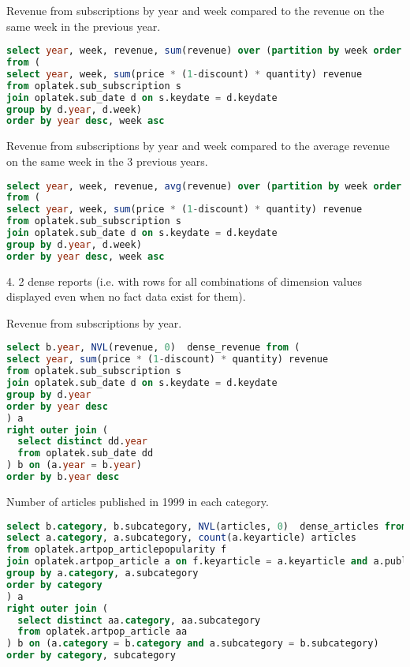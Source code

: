 Revenue from subscriptions by year and week compared to the revenue on the same week in the previous year.
\begin{lstlisting}[language=sql] 
select year, week, revenue, sum(revenue) over (partition by week order by year RANGE BETWEEN 1 PRECEDING AND 1 PRECEDING) revenue_last_year_this_week        
from (
select year, week, sum(price * (1-discount) * quantity) revenue 
from oplatek.sub_subscription s 
join oplatek.sub_date d on s.keydate = d.keydate 
group by d.year, d.week)
order by year desc, week asc
\end{lstlisting}

Revenue from subscriptions by year and week compared to the average revenue on the same week in the 3 previous years.
\begin{lstlisting}[language=sql] 
select year, week, revenue, avg(revenue) over (partition by week order by year RANGE BETWEEN 3 PRECEDING AND 1 PRECEDING) avg_revenue_prev_3_years        
from (
select year, week, sum(price * (1-discount) * quantity) revenue 
from oplatek.sub_subscription s 
join oplatek.sub_date d on s.keydate = d.keydate
group by d.year, d.week)
order by year desc, week asc
\end{lstlisting}

4. 2 dense reports (i.e. with rows for all combinations of dimension values
displayed even when no fact data exist for them).

Revenue from subscriptions by year.
\begin{lstlisting}[language=sql] 
select b.year, NVL(revenue, 0)  dense_revenue from (
select year, sum(price * (1-discount) * quantity) revenue 
from oplatek.sub_subscription s 
join oplatek.sub_date d on s.keydate = d.keydate 
group by d.year 
order by year desc
) a
right outer join (
  select distinct dd.year
  from oplatek.sub_date dd
) b on (a.year = b.year)
order by b.year desc
\end{lstlisting}

Number of articles published in 1999 in each category.
\begin{lstlisting}[language=sql] 
select b.category, b.subcategory, NVL(articles, 0)  dense_articles from (
select a.category, a.subcategory, count(a.keyarticle) articles
from oplatek.artpop_articlepopularity f
join oplatek.artpop_article a on f.keyarticle = a.keyarticle and a.publicationyear = 1999
group by a.category, a.subcategory
order by category
) a
right outer join (
  select distinct aa.category, aa.subcategory
  from oplatek.artpop_article aa
) b on (a.category = b.category and a.subcategory = b.subcategory)
order by category, subcategory
\end{lstlisting}
